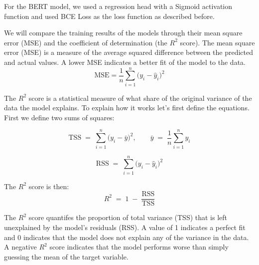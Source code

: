 \documentclass[twoside]{ctuthesis}
\theoremstyle{plain}
\theoremstyle{definition}
\theoremstyle{note}
\begin{document}
For the BERT model, we used a regression head with a Sigmoid activation function and used BCE Loss as the loss function as described before.\par

We will compare the training results of the models through their mean square error (MSE) and the coefficient of determination (the $R^2$ score). The mean square error (MSE) is a measure of the average squared difference between the predicted and actual values. A lower MSE indicates a better fit of the model to the data. 
\begin{equation}
	\mathrm{MSE} = \frac{1}{n}\sum_{i=1}^{n}\bigl(y_i - \hat{y}_i\bigr)^2
\end{equation}

The $R^2$ score is a statistical measure of what share of the original variance of the data the model explains. To explain how it works let's first define the equations. First we define two sums of squares:\par
\begin{equation}
	\mathrm{TSS} \;=\; \sum_{i=1}^{n} \bigl(y_i - \bar{y}\bigr)^2,
	\qquad
	\bar{y} \;=\; \frac{1}{n}\sum_{i=1}^{n} y_i
\end{equation}


\begin{equation}
	\mathrm{RSS} \;=\; \sum_{i=1}^{n} \bigl(y_i - \hat{y}_i\bigr)^2
\end{equation}

The $R^2$ score is then:
\begin{equation}
	R^{2} \;=\; 1 \;-\; \frac{\mathrm{RSS}}{\mathrm{TSS}}
\end{equation}

The $R^2$ score quantifes the proportion of total variance (TSS) that is left unexplained by the model's residuals (RSS).  A value of 1 indicates a perfect fit and 0 indicates that the model does not explain any of the variance in the data. A negative $R^2$ score indicates that the model performs worse than simply guessing the mean of the target variable.\par
\end{document}
